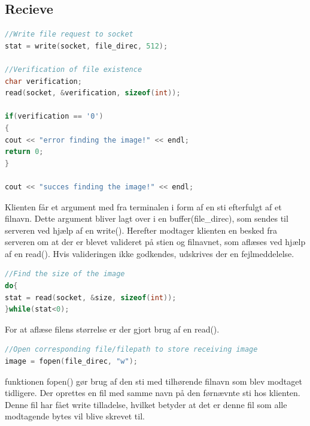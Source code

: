 \documentclass[12pt,fleqn,a4paper]{report}
\begin{document}
\subsection{Recieve}
\begin{framed}
\begin{lstlisting}[language=C++]
//Write file request to socket
stat = write(socket, file_direc, 512);
	
//Verification of file existence
char verification;
read(socket, &verification, sizeof(int));
	
if(verification == '0')
{
cout << "error finding the image!" << endl;
return 0;
}
	
cout << "succes finding the image!" << endl;
\end{lstlisting}
\end{framed}

Klienten får et argument med fra terminalen i form af en sti efterfulgt af et filnavn. Dette argument bliver lagt over i en buffer(file\_direc), som sendes til serveren ved hjælp af en write(). 
Herefter modtager klienten en besked fra serveren om at der er blevet valideret på stien og filnavnet, som aflæses ved hjælp af en read(). Hvis valideringen ikke godkendes, udskrives der en fejlmeddelelse.

\begin{framed}
\begin{lstlisting}[language=C++]
//Find the size of the image
do{
stat = read(socket, &size, sizeof(int));
}while(stat<0);
\end{lstlisting}
\end{framed}

For at aflæse filens størrelse er der gjort brug af en read().

\newpage
\begin{framed}
\begin{lstlisting}[language=C++]
//Open corresponding file/filepath to store receiving image
image = fopen(file_direc, "w");
\end{lstlisting}
\end{framed}

 funktionen fopen() gør brug af den sti med tilhørende filnavn som blev modtaget tidligere.
 Der oprettes en fil med samme navn på den førnævnte sti hos klienten. Denne fil har fået write tilladelse, hvilket betyder at det er denne fil som alle modtagende bytes vil blive skrevet til.
\end{document}
